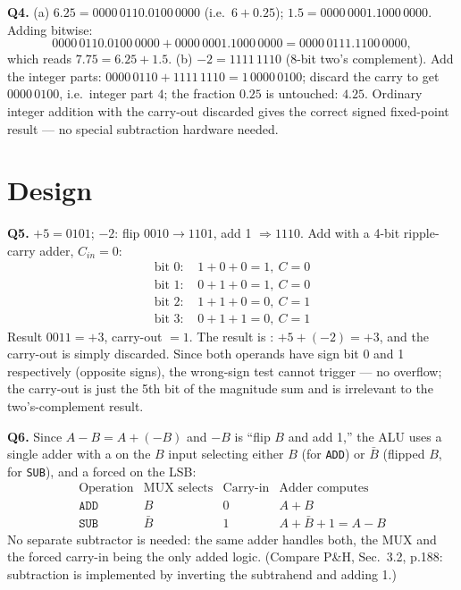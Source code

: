 \documentclass[11pt]{article}
\begin{document}
\textbf{Q4.} (a) $6.25 = 0000\,0110.0100\,0000$ (i.e.\ $6 + 0.25$); $1.5 = 0000\,0001.1000\,0000$. Adding bitwise:
\[
0000\,0110.0100\,0000 + 0000\,0001.1000\,0000 = 0000\,0111.1100\,0000,
\]
which reads $7.75 = 6.25 + 1.5$. (b) $-2 = 1111\,1110$ (8-bit two's complement). Add the integer parts: $0000\,0110 + 1111\,1110 = 1\,0000\,0100$; discard the carry to get $0000\,0100$, i.e.\ integer part $4$; the fraction $0.25$ is untouched: $4.25$. Ordinary integer addition with the carry-out discarded gives the correct signed fixed-point result --- no special subtraction hardware needed.

\section{Design}

\textbf{Q5.} $+5 = 0101$; $-2$: flip $0010 \to 1101$, add 1 $\Rightarrow 1110$. Add with a 4-bit ripple-carry adder, $C_{in} = 0$:
\[
\begin{aligned}
\text{bit 0: } &1+0+0 = 1,\ C=0 \\
\text{bit 1: } &0+1+0 = 1,\ C=0 \\
\text{bit 2: } &1+1+0 = 0,\ C=1 \\
\text{bit 3: } &0+1+1 = 0,\ C=1
\end{aligned}
\]
Result $0011 = +3$, carry-out $= 1$. The result is : $+5 + (-2) = +3$, and the carry-out is simply discarded. Since both operands have sign bit 0 and 1 respectively (opposite signs), the wrong-sign test cannot trigger --- no overflow; the carry-out is just the 5th bit of the magnitude sum and is irrelevant to the two's-complement result.

\textbf{Q6.} Since $A - B = A + (-B)$ and $-B$ is ``flip $B$ and add 1,'' the ALU uses a single adder with a  on the $B$ input selecting either $B$ (for \texttt{ADD}) or $\bar B$ (flipped $B$, for \texttt{SUB}), and a forced  on the LSB:
\[
\begin{array}{c|c|c|c}
\text{Operation} & \text{MUX selects} & \text{Carry-in} & \text{Adder computes} \\
\hline
\texttt{ADD} & B & 0 & A + B \\
\texttt{SUB} & \bar B & 1 & A + \bar B + 1 = A - B
\end{array}
\]
No separate subtractor is needed: the same adder handles both, the MUX and the forced carry-in being the only added logic. (Compare P\&H, Sec.~3.2, p.188: subtraction is implemented by inverting the subtrahend and adding 1.)
\end{document}

